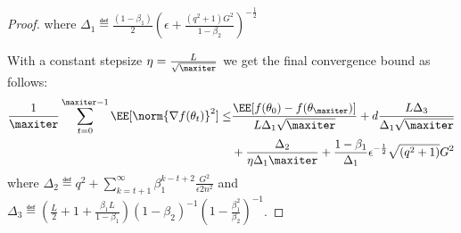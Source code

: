 \documentclass[11pt]{article}
\begin{document}
\begin{proof}
where $\Delta_1 \eqdef \frac{(1-\beta_1)}{2} (\epsilon + \frac{(q^2+1)G^2}{1 - \beta_2})^{-\frac{1}{2}}$

With a constant stepsize $\eta = \frac{L}{\sqrt{\maxiter}}$ we get the final convergence bound as follows:
\begin{equation}
\begin{split}
 \frac{1}{\maxiter}\sum_{t=0}^{\maxiter -1} \EE[\norm{\nabla f(\theta_t)}^2] \leq & \frac{\EE[ f(\theta_{0}) - f(\theta_{\maxiter})]}{L \Delta_1 \sqrt{\maxiter}} + 
d\frac{L \Delta_3}{\Delta_1 \sqrt{\maxiter}} \\
& + \frac{\Delta_2}{\eta \Delta_1\maxiter} +\frac{1-\beta_1}{\Delta_1}  \epsilon^{-\frac{1}{2}} \sqrt{(q^2+1)}G^2 
\end{split}
\end{equation}
where $\Delta_2 \eqdef q^2 + \sum_{k=t+1}^\infty  \beta_1^{k-t+2}\frac{G^2 }{\epsilon 2n^2}$ and $\Delta_3 \eqdef \left(\frac{L}{2} + 1+ \frac{\beta_1L}{1-\beta_1} \right) (1-\beta_2)^{-1} (1 - \frac{\beta_1^{2}}{\beta_2})^{-1}$.





\end{proof}



\end{document}
